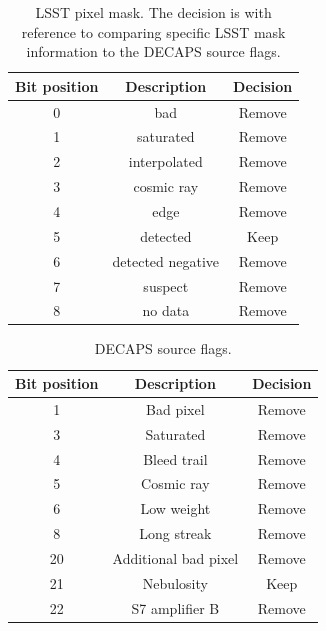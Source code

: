 \documentclass[DM,lsstdraft,toc,usenatbib]{lsstdoc}
\begin{document}
\begin{table}
\centering
\caption{LSST pixel mask. The decision is with reference to comparing specific LSST mask information to the DECAPS source flags.}
\label{tab:lsst_mask}
\begin{tabular}{ ccc} 
\hline
Bit position & Description & Decision  \\ 
\hline
0  & bad    & Remove               \\ 
1  & saturated   & Remove       \\ 
2  & interpolated  & Remove      \\ 
3  & cosmic ray   & Remove     \\ 
4  & edge          & Remove      \\ 
5  & detected   & Keep         \\ 
6  & detected negative  & Remove  \\ 
7  & suspect     & Remove         \\ 
8  & no data     & Remove         \\ 
\hline
\end{tabular}
\end{table}

\begin{table}
\centering
\caption{DECAPS source flags.}
\label{tab:decaps_flags}
\begin{tabular}{ ccc} 
\hline
Bit position & Description & Decision \\ 
\hline 
1  &     Bad pixel   & Remove         \\ 
3  &    Saturated    & Remove     \\ 
4  &    Bleed trail   & Remove      \\ 
5  &    Cosmic ray    & Remove      \\ 
6  &    Low weight     & Remove    \\ 
8  &    Long streak   & Remove      \\ 
20  &   Additional bad pixel  & Remove     \\ 
21 &    Nebulosity    & Keep    \\ 
22  &   S7 amplifier B    & Remove       \\ 
\hline
\end{tabular}
\end{table}
\end{document}
